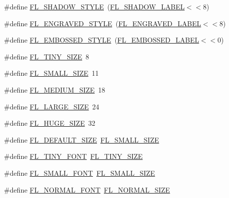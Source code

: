 \begin{DoxyCompactItemize}
\item 
\#define \hyperlink{forms_8_h_a93d3d8a010409b840f5f5123ffdf18f9}{F\+L\+\_\+\+S\+H\+A\+D\+O\+W\+\_\+\+S\+T\+Y\+LE}~(\hyperlink{_enumerations_8_h_ab44620a0effd74a4ace6244e6e6bb2ee}{F\+L\+\_\+\+S\+H\+A\+D\+O\+W\+\_\+\+L\+A\+B\+EL}$<$$<$8)
\item 
\#define \hyperlink{forms_8_h_a37e3494fb7a9cfcda03c2dcddec67233}{F\+L\+\_\+\+E\+N\+G\+R\+A\+V\+E\+D\+\_\+\+S\+T\+Y\+LE}~(\hyperlink{_enumerations_8_h_a2f03450b19c29126ec202b3505023b7b}{F\+L\+\_\+\+E\+N\+G\+R\+A\+V\+E\+D\+\_\+\+L\+A\+B\+EL}$<$$<$8)
\item 
\#define \hyperlink{forms_8_h_a820b62dbe97d0c5711346c983e4b69ea}{F\+L\+\_\+\+E\+M\+B\+O\+S\+S\+E\+D\+\_\+\+S\+T\+Y\+LE}~(\hyperlink{_enumerations_8_h_aa8215ff52c3386f676ac92d55bf57c18}{F\+L\+\_\+\+E\+M\+B\+O\+S\+S\+E\+D\+\_\+\+L\+A\+B\+EL}$<$$<$0)
\item 
\#define \hyperlink{forms_8_h_a39154aba2c04273a1f8606f847316081}{F\+L\+\_\+\+T\+I\+N\+Y\+\_\+\+S\+I\+ZE}~8
\item 
\#define \hyperlink{forms_8_h_ac0cfd0680ac4b148fb5ad71f9c8c3c3e}{F\+L\+\_\+\+S\+M\+A\+L\+L\+\_\+\+S\+I\+ZE}~11
\item 
\#define \hyperlink{forms_8_h_a257a509361c7acc64a397cdb2cc8b93a}{F\+L\+\_\+\+M\+E\+D\+I\+U\+M\+\_\+\+S\+I\+ZE}~18
\item 
\#define \hyperlink{forms_8_h_a521a6ac1465ef3571c6d80333395ea97}{F\+L\+\_\+\+L\+A\+R\+G\+E\+\_\+\+S\+I\+ZE}~24
\item 
\#define \hyperlink{forms_8_h_a053da097db98e82815e23d604f2a9b9f}{F\+L\+\_\+\+H\+U\+G\+E\+\_\+\+S\+I\+ZE}~32
\item 
\#define \hyperlink{forms_8_h_a1ac434d1af16062d9b49985b8e4059e3}{F\+L\+\_\+\+D\+E\+F\+A\+U\+L\+T\+\_\+\+S\+I\+ZE}~\hyperlink{forms_8_h_ac0cfd0680ac4b148fb5ad71f9c8c3c3e}{F\+L\+\_\+\+S\+M\+A\+L\+L\+\_\+\+S\+I\+ZE}
\item 
\#define \hyperlink{forms_8_h_a82af26d4509d90d881a4b91abc84146c}{F\+L\+\_\+\+T\+I\+N\+Y\+\_\+\+F\+O\+NT}~\hyperlink{forms_8_h_a39154aba2c04273a1f8606f847316081}{F\+L\+\_\+\+T\+I\+N\+Y\+\_\+\+S\+I\+ZE}
\item 
\#define \hyperlink{forms_8_h_ab115ae363840ec64305f03f5feaa39f1}{F\+L\+\_\+\+S\+M\+A\+L\+L\+\_\+\+F\+O\+NT}~\hyperlink{forms_8_h_ac0cfd0680ac4b148fb5ad71f9c8c3c3e}{F\+L\+\_\+\+S\+M\+A\+L\+L\+\_\+\+S\+I\+ZE}
\item 
\#define \hyperlink{forms_8_h_a1a33e9ed267da7321edd09c668bcf5ee}{F\+L\+\_\+\+N\+O\+R\+M\+A\+L\+\_\+\+F\+O\+NT}~\hyperlink{_enumerations_8_h_a200c616eb9f1a5d32a0b79847cef8cc8}{F\+L\+\_\+\+N\+O\+R\+M\+A\+L\+\_\+\+S\+I\+ZE}
$$
\end{DoxyCompactItemize}
